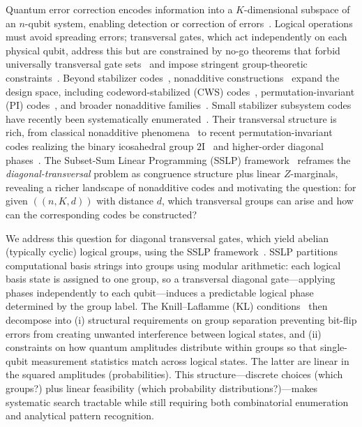 \documentclass[pdflatex,sn-nature]{sn-jnl}%
\theoremstyle{thmstyleone}%
\theoremstyle{thmstyletwo}%
\theoremstyle{thmstylethree}%
\begin{document}
Quantum error correction encodes information into a $K$-dimensional subspace of an $n$-qubit system, enabling detection or correction of errors~\cite{Nielsen2010Quantum,Calderbank1998Quantum,Steane1996Error,Knill1997Theory}. Logical operations must avoid spreading errors; transversal gates, which act independently on each physical qubit, address this but are constrained by no-go theorems that forbid universally transversal gate sets~\cite{Zeng2011Transversality,Eastin2009Restrictions} and impose stringent group-theoretic constraints~\cite{Liu2023Approximate,Anderson2016Classification}. Beyond stabilizer codes~\cite{Calderbank1998Quantum,Gottesman1997Stabilizer}, nonadditive constructions~\cite{Rains1997Nonadditive} expand the design space, including codeword-stabilized (CWS) codes~\cite{Cross2009Codeword,Chuang2009Codeword,Yu2007Graphical,Yu2008Nonadditive,Grassl2008Nonadditive}, permutation-invariant (PI) codes~\cite{Pollatsek2004Permutationally,Ouyang2014Permutation,Ouyang2021Permutation,Ouyang2024Measurement}, and broader nonadditive families~\cite{Du2024Characterizing}. Small stabilizer subsystem codes have recently been systematically enumerated~\cite{Cross2025Small}. Their transversal structure is rich, from classical nonadditive phenomena~\cite{Rains2002Quantum} to recent permutation-invariant codes realizing the binary icosahedral group $2\mathrm{I}$~\cite{Kubischta2023Family} and higher-order diagonal phases~\cite{Kubischta2024Permutation}. The Subset-Sum Linear Programming (SSLP) framework~\cite{Zhang2025Transversal} reframes the \emph{diagonal-transversal} problem as congruence structure plus linear $Z$-marginals, revealing a richer landscape of nonadditive codes and motivating the question: for given $((n,K,d))$ with distance $d$, which transversal groups can arise and how can the corresponding codes be constructed?

We address this question for diagonal transversal gates, which yield abelian (typically cyclic) logical groups, using the SSLP framework~\cite{Zhang2025Transversal}. SSLP partitions computational basis strings into groups using modular arithmetic: each logical basis state is assigned to one group, so a transversal diagonal gate---applying phases independently to each qubit---induces a predictable logical phase determined by the group label. The Knill--Laflamme (KL) conditions~\cite{Knill1997Theory} then decompose into (i) structural requirements on group separation preventing bit-flip errors from creating unwanted interference between logical states, and (ii) constraints on how quantum amplitudes distribute within groups so that single-qubit measurement statistics match across logical states. The latter are linear in the squared amplitudes (probabilities). This structure---discrete choices (which groups?) plus linear feasibility (which probability distributions?)---makes systematic search tractable while still requiring both combinatorial enumeration and analytical pattern recognition.
\end{document}
